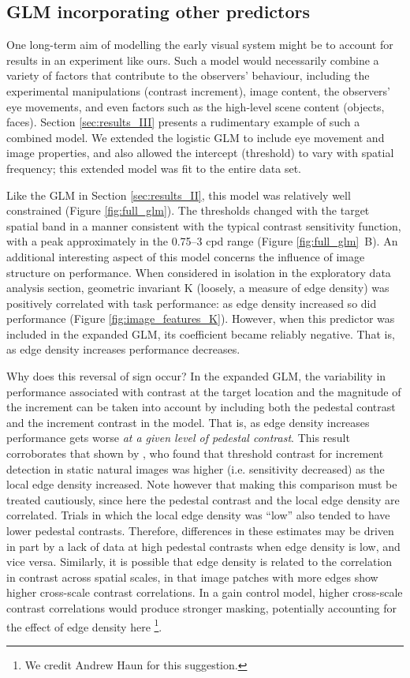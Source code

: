 \documentclass[11pt,a4paper]{article}
\begin{document}
{\subsection{GLM incorporating other predictors}

One long-term aim of modelling the early visual system might be to account for results in an experiment like ours.
Such a model would necessarily combine a variety of factors that contribute to the observers' behaviour, including the experimental manipulations (contrast increment), image content, the observers' eye movements, and even factors such as the high-level scene content (objects, faces).
Section \ref{sec:results_III} presents a rudimentary example of such a combined model.
We extended the logistic GLM to include eye movement and image properties, and also allowed the intercept (threshold) to vary with spatial frequency; this extended model was fit to the entire data set.

Like the GLM in Section \ref{sec:results_II}, this model was relatively well constrained (Figure \ref{fig:full_glm}).
The thresholds changed with the target spatial band in a manner consistent with the typical contrast sensitivity function, with a peak approximately in the 0.75--3 cpd range (Figure \ref{fig:full_glm}~B).
An additional interesting aspect of this model concerns the influence of image structure on performance.
When considered in isolation in the exploratory data analysis section, geometric invariant K (loosely, a measure of edge density) was positively correlated with task performance: as edge density increased so did performance (Figure \ref{fig:image_features_K}).
However, when this predictor was included in the expanded GLM, its coefficient became reliably negative.
That is, as edge density increases performance decreases.

Why does this reversal of sign occur?
In the expanded GLM, the variability in performance associated with contrast at the target location and the magnitude of the increment can be taken into account by including both the pedestal contrast and the increment contrast in the model.
That is, as edge density increases performance gets worse \textit{at a given level of pedestal contrast}.
This result corroborates that shown by \citet{Bex2009}, who found that threshold contrast for increment detection in static natural images was higher (i.e. sensitivity decreased) as the local edge density increased.
Note however that making this comparison must be treated cautiously, since here the pedestal contrast and the local edge density are correlated.
Trials in which the local edge density was ``low'' also tended to have lower pedestal contrasts.
Therefore, differences in these estimates may be driven in part by a lack of data at high pedestal contrasts when edge density is low, and vice versa.
Similarly, it is possible that edge density is related to the correlation in contrast across spatial scales, in that image patches with more edges show higher cross-scale contrast correlations. 
In a gain control model, higher cross-scale contrast correlations would produce stronger masking, potentially accounting for the effect of edge density here
\footnote{We credit Andrew Haun for this suggestion.}.

}
\end{document}
